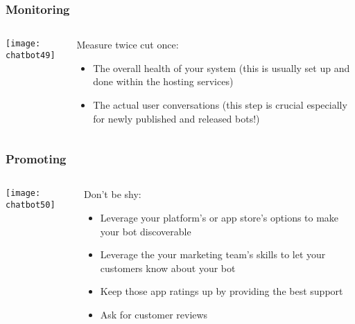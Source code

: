 \begin{frame}[fragile]\frametitle{Monitoring}
    \begin{columns}
    \begin{column}[t]{0.5\linewidth}
\begin{center}
\texttt{[image: chatbot49]}
\end{center}
\end{column}
    \begin{column}[t]{0.5\linewidth}
Measure twice cut once:

\begin{itemize}
\item The overall health of your system (this is usually set up and done within the hosting services)
\item The actual user conversations (this step is crucial especially for newly published and released bots!)
\end{itemize}
\end{column}
\end{columns}
\end{frame}

\begin{frame}[fragile]\frametitle{Promoting}
    \begin{columns}
    \begin{column}[t]{0.5\linewidth}
\begin{center}
\texttt{[image: chatbot50]}
\end{center}
\end{column}
    \begin{column}[t]{0.5\linewidth}
Don't be shy:

\begin{itemize}
\item Leverage your platform's or app store's options to make your bot discoverable
\item Leverage the your marketing team's skills to let your customers know about your bot
\item Keep those app ratings up by providing the best support
\item Ask for customer reviews
\end{itemize}
\end{column}
\end{columns}
\end{frame}

